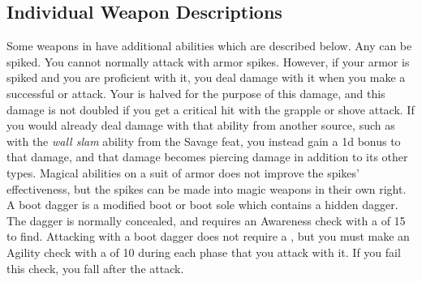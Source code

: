     \subsection{Individual Weapon Descriptions}
        Some weapons in  have additional abilities which are described below.
         Any  can be spiked.
        You cannot normally attack with armor spikes.
        However, if your armor is spiked and you are proficient with it, you deal damage with it when you make a successful  or  attack.
        Your  is halved for the purpose of this damage, and this damage is not doubled if you get a critical hit with the grapple or shove attack.
        If you would already deal damage with that ability from another source, such as with the \textit{wall slam} ability from the Savage feat, you instead gain a \plus1d bonus to that damage, and that damage becomes piercing damage in addition to its other types.
        Magical abilities on a suit of armor does not improve the spikes' effectiveness, but the spikes can be made into magic weapons in their own right.
         A boot dagger is a modified boot or boot sole which contains a hidden dagger.
        The dagger is normally concealed, and requires an Awareness check with a  of 15 to find.
        Attacking with a boot dagger does not require a , but you must make an Agility check with a  of 10 during each phase that you attack with it.
        If you fail this check, you fall  after the attack.

